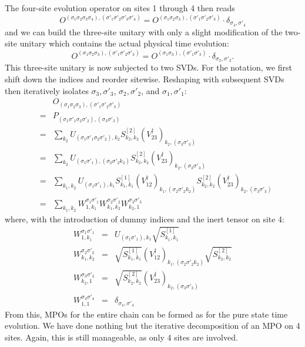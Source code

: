 The four-site evolution operator on sites 1 through 4 then reads
\begin{equation}
O^{(\sigma_1\sigma_2\sigma_3\sigma_4), (\sigma'_1\sigma'_2\sigma'_3\sigma'_4)} =
O^{(\sigma_1\sigma_2\sigma_3), (\sigma'_1\sigma'_2\sigma'_3)}\cdot \delta_{\sigma_4,\sigma'_4}
\end{equation}
and we can build the three-site unitary with only a slight modification of the two-site unitary which contains the actual physical time evolution:
\begin{equation}
O^{(\sigma_1\sigma_2\sigma_3), (\sigma'_1\sigma'_2\sigma'_3)} = O^{(\sigma_1\sigma_3), (\sigma'_1\sigma'_3)} \cdot \delta_{\sigma_2,\sigma'_2} .
\end{equation}
This three-site unitary is now subjected to two SVDs. For the notation, we first shift down the indices and reorder sitewise. Reshaping with subsequent SVDs then iteratively isolates $\sigma_3,\sigma'_3$, $\sigma_2,\sigma'_2$, and $\sigma_1,\sigma'_1$: 
\begin{eqnarray*}
& & O_{(\sigma_1\sigma_2\sigma_3), (\sigma'_1\sigma'_2\sigma'_3)} \\
&=& P_{(\sigma_1 \sigma'_1\sigma_2\sigma'_2),(\sigma_3\sigma'_3)} \\
&=& \sum_{k_2} U_{(\sigma_1 \sigma'_1\sigma_2\sigma'_2),k_2} S^{[2]}_{k_2,k_2} (V^\dagger_{23})_{k_2,(\sigma_3\sigma'_3)} \\
&=&  \sum_{k_2} U_{(\sigma_1 \sigma'_1),(\sigma_2\sigma'_2 k_2)} S^{[2]}_{k_2,k_2} (V^\dagger_{23})_{k_2,(\sigma_3\sigma'_3)} \\
&=& \sum_{k_1,k_2} U_{(\sigma_1 \sigma'_1),k_1} S^{[1]}_{k_1,k_1} (V^\dagger_{12})_{k_1, (\sigma_2\sigma'_2 k_2)} S^{[2]}_{k_2,k_2} (V^\dagger_{23})_{k_2,(\sigma_3\sigma'_3)} \\
&=& \sum_{k_1,k_2} W^{\sigma_1 \sigma'_1}_{1,k_1} W^{\sigma_2 \sigma'_2}_{k_1,k_2} W^{\sigma_3 \sigma'_3}_{k_2,1} 
\end{eqnarray*}
where, with the introduction of dummy indices and the inert tensor on site 4:
\begin{eqnarray}
W^{\sigma_1 \sigma'_1}_{1,k_1} &=& U_{(\sigma_1 \sigma'_1),k_1} \sqrt{S^{[1]}_{k_1,k_1}} \\
W^{\sigma_2 \sigma'_2}_{k_1,k_2} &=& \sqrt{S^{[1]}_{k_1,k_1}} (V^\dagger_{12})_{k_1, (\sigma_2\sigma'_2 k_2)} \sqrt{S^{[2]}_{k_2,k_2}} \\
W^{\sigma_3 \sigma'_3}_{k_2,1} &=& \sqrt{S^{[2]}_{k_2,k_2}} (V^\dagger_{23})_{k_2,(\sigma_3\sigma'_3)} \\
W^{\sigma_4 \sigma'_4}_{1,1} &=& \delta_{\sigma_4,\sigma'_4}
\end{eqnarray}
From this, MPOs for the entire chain can be formed as for the pure state time evolution. We have done nothing but the iterative decomposition of an MPO on 4 sites. Again, this is still manageable, as only 4 sites are involved. 

